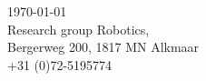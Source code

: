 \documentclass[12pt]{scrreprt}
\begin{document}
\begin{titlepage}


{\large \today}\\[2cm] %


 

\Large Research group Robotics,\\ Bergerweg 200, 1817 MN Alkmaar\\
+31 (0)72-5195774



\end{titlepage}
\end{document}
